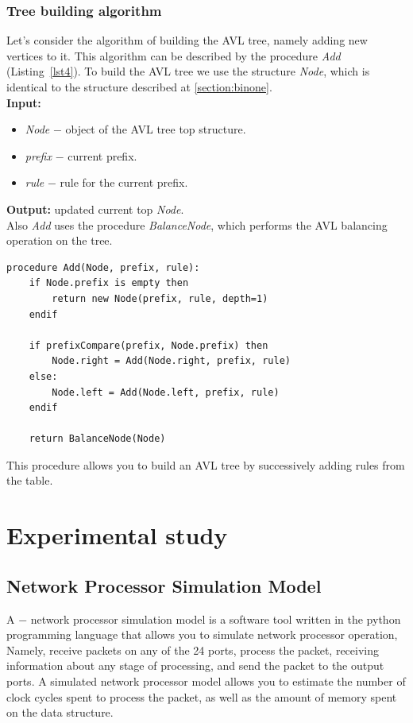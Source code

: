 \documentclass[conference]{IEEEtran}
\begin{document}
            \subsubsection{Tree building algorithm}
                Let's consider the algorithm of building the AVL tree, 
                namely adding new vertices to it. This algorithm can be 
                described by the procedure \emph{Add} (Listing~\ref{lst4}).
                To build the AVL tree we use the structure \emph{Node}, 
                which is identical to the structure described at \ref{section:binone}.
                \\
                {\bf Input:}
                \begin{itemize}
                    \item \emph{Node} $-$ object of the AVL tree top structure.
                    \item \emph{prefix} $-$ current prefix.
                    \item \emph{rule} $-$ rule for the current prefix.
                \end{itemize}
                {\bf Output:} updated current top \emph{Node}.
                \\
                Also \emph{Add} uses the procedure \emph{BalanceNode}, 
                which performs the AVL balancing operation on the tree.
                \\
\begin{lstlisting}[caption=Procedure for adding the vertex to the AVL tree., label=lst4]
procedure Add(Node, prefix, rule):
    if Node.prefix is empty then
        return new Node(prefix, rule, depth=1)
    endif
    
    if prefixCompare(prefix, Node.prefix) then
        Node.right = Add(Node.right, prefix, rule)
    else:
        Node.left = Add(Node.left, prefix, rule)
    endif
    
    return BalanceNode(Node)
\end{lstlisting}
\vspace{1em}
This procedure allows you to build an AVL tree by successively adding rules from the table.
    \section{Experimental study}
        \subsection{Network Processor Simulation Model}
            A $-$ network processor simulation model is a software tool written 
            in the python programming language that allows you to simulate network processor operation, 
            Namely, receive packets on any of the 24 ports, process the packet, 
            receiving information about any stage of processing, and send the packet to the output ports.
            A simulated network processor model allows you to estimate 
            the number of clock cycles spent to process the packet, 
            as well as the amount of memory spent on the data structure.
        
\end{document}
